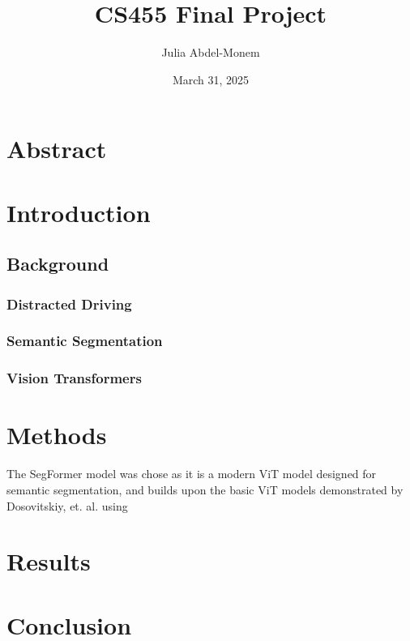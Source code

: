 \documentclass[12pt]{article}
\title{CS455 Final Project}
\author{Julia Abdel-Monem}
\date{March 31, 2025}
\begin{document}
    \maketitle

    \section*{Abstract}


    \section{Introduction}

    \subsection{Background}

    \subsubsection{Distracted Driving}

    \subsubsection{Semantic Segmentation}

    \subsubsection{Vision Transformers}

    \section{Methods}

    The SegFormer model was chose as it is a modern ViT model designed for semantic segmentation, and builds upon the basic ViT models demonstrated by Dosovitskiy, et. al. \cite{DBLP:journals/corr/abs-2010-11929} using

    \section{Results}

    \section{Conclusion}

\end{document}
